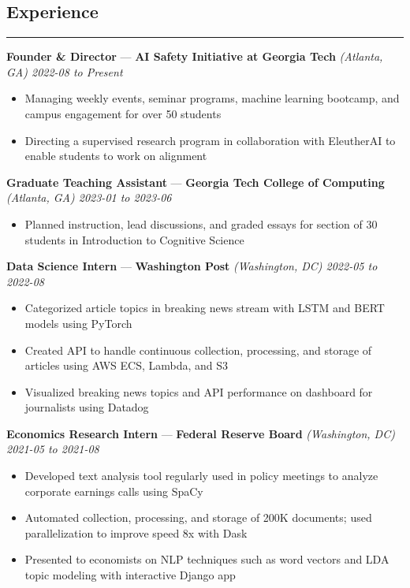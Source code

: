 \documentclass[10pt]{article}
\newcommand{\resumeHeading}[1]{
    \subsection*{#1}
    \hrule
    \vspace*{5pt}
}
\newcommand{\resumeSubHeading}[5]{
    \vspace*{5pt}
    \textbf{#1} — \textbf{#2} \textsl{(#3) \hfill #4 to #5}
}
\begin{document}

\resumeHeading{Experience \vspace{-2.5pt}}

\resumeSubHeading
    {Founder \& Director}
    {AI Safety Initiative at Georgia Tech}
    {Atlanta, GA}
    {2022-08}
    {Present}
    \begin{itemize}
        \item Managing weekly events, seminar programs, machine learning bootcamp, and campus engagement for over 50 students
        \item Directing a supervised research program in collaboration with EleutherAI to enable students to work on alignment
\end{itemize}

\resumeSubHeading
    {Graduate Teaching Assistant}
    {Georgia Tech College of Computing}
    {Atlanta, GA}
    {2023-01}
    {2023-06}
\begin{itemize}
    \item Planned instruction, lead discussions, and graded essays for section of 30 students in Introduction to Cognitive Science
\end{itemize}

\resumeSubHeading
    {Data Science Intern}
    {Washington Post}
    {Washington, DC}
    {2022-05}
    {2022-08}
\begin{itemize}
    \item Categorized article topics in breaking news stream with LSTM and BERT models using PyTorch
    \item Created API to handle continuous collection, processing, and storage of articles using AWS ECS, Lambda, and S3
    \item Visualized breaking news topics and API performance on dashboard for journalists using Datadog
\end{itemize}

\resumeSubHeading
    {Economics Research Intern}
    {Federal Reserve Board}
    {Washington, DC}
    {2021-05}
    {2021-08}
\begin{itemize}
    \item Developed text analysis tool regularly used in policy meetings to analyze corporate earnings calls using SpaCy
    \item Automated collection, processing, and storage of 200K documents; used parallelization to improve speed 8x with Dask
    \item Presented to economists on NLP techniques such as word vectors and LDA topic modeling with interactive Django app
\end{itemize}
\end{document}

